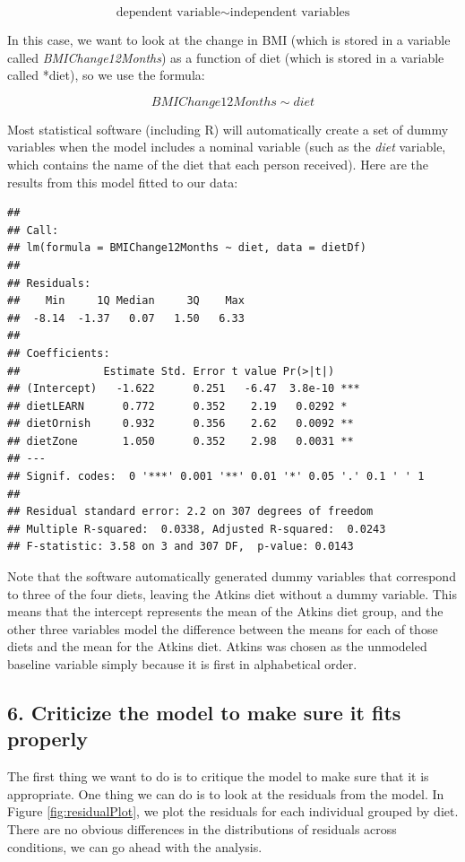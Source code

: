 \documentclass[12pt,]{book}
\theoremstyle{definition}
\theoremstyle{definition}
\theoremstyle{definition}
\theoremstyle{remark}
\begin{document}
\[ 
\text{dependent variable} \sim \text{independent variables}
\]

In this case, we want to look at the change in BMI (which is stored in a variable called \emph{BMIChange12Months}) as a function of diet (which is stored in a variable called *diet), so we use the formula:

\[
BMIChange12Months \sim diet
\]

Most statistical software (including R) will automatically create a set of dummy variables when the model includes a nominal variable (such as the \emph{diet} variable, which contains the name of the diet that each person received). Here are the results from this model fitted to our data:

\begin{verbatim}
## 
## Call:
## lm(formula = BMIChange12Months ~ diet, data = dietDf)
## 
## Residuals:
##    Min     1Q Median     3Q    Max 
##  -8.14  -1.37   0.07   1.50   6.33 
## 
## Coefficients:
##             Estimate Std. Error t value Pr(>|t|)    
## (Intercept)   -1.622      0.251   -6.47  3.8e-10 ***
## dietLEARN      0.772      0.352    2.19   0.0292 *  
## dietOrnish     0.932      0.356    2.62   0.0092 ** 
## dietZone       1.050      0.352    2.98   0.0031 ** 
## ---
## Signif. codes:  0 '***' 0.001 '**' 0.01 '*' 0.05 '.' 0.1 ' ' 1
## 
## Residual standard error: 2.2 on 307 degrees of freedom
## Multiple R-squared:  0.0338, Adjusted R-squared:  0.0243 
## F-statistic: 3.58 on 3 and 307 DF,  p-value: 0.0143
\end{verbatim}

Note that the software automatically generated dummy variables that correspond to three of the four diets, leaving the Atkins diet without a dummy variable. This means that the intercept represents the mean of the Atkins diet group, and the other three variables model the difference between the means for each of those diets and the mean for the Atkins diet. Atkins was chosen as the unmodeled baseline variable simply because it is first in alphabetical order.

\hypertarget{criticize-the-model-to-make-sure-it-fits-properly}{%
\subsection{6. Criticize the model to make sure it fits properly}\label{criticize-the-model-to-make-sure-it-fits-properly}}

The first thing we want to do is to critique the model to make sure that it is appropriate. One thing we can do is to look at the residuals from the model. In Figure \ref{fig:residualPlot}, we plot the residuals for each individual grouped by diet. There are no obvious differences in the distributions of residuals across conditions, we can go ahead with the analysis.
\end{document}
